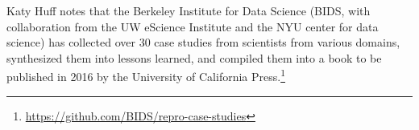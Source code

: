 \documentclass[a4paper,UKenglish]{dagrep}
\begin{document}
Katy Huff notes that the Berkeley Institute for Data Science (BIDS, with collaboration from the UW eScience Institute and the NYU center for data science) has collected over 30 case studies from scientists from various domains, synthesized them into lessons learned, and compiled them into a book to be published in 2016 by the University of California Press.\footnote{\url{https://github.com/BIDS/repro-case-studies}} 






%
\end{document}
